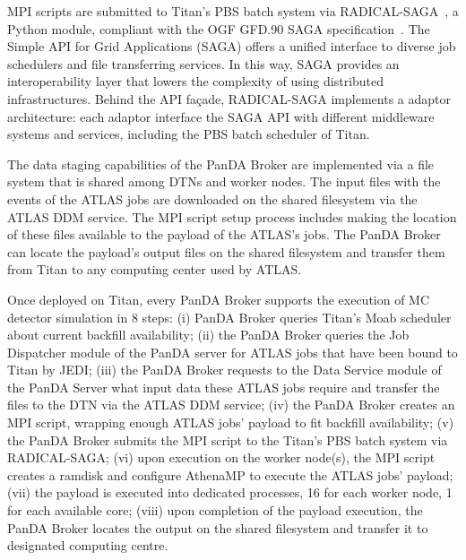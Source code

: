 MPI scripts are submitted to Titan's PBS batch system via
RADICAL-SAGA~\cite{radical-saga_url}, a Python module, compliant with the OGF
GFD.90 SAGA specification~\cite{goodale2008simple}. The Simple API for Grid
Applications (SAGA) offers a unified interface to diverse job schedulers and
file transferring services. In this way, SAGA provides an interoperability layer
that lowers the complexity of using distributed infrastructures. Behind the API
façade, RADICAL-SAGA implements a adaptor architecture: each adaptor interface
the SAGA API with different middleware systems and services, including the PBS
batch scheduler of Titan.

The data staging capabilities of the PanDA Broker are implemented via a file
system that is shared among DTNs and worker nodes. The input files with the
events of the ATLAS jobs are downloaded on the shared filesystem via the ATLAS
DDM service. The MPI script setup process includes making the location of these
files available to the payload of the ATLAS's jobs. The PanDA Broker can locate
the payload's output files on the shared filesystem and transfer them from Titan
to any computing center used by ATLAS.

Once deployed on Titan, every PanDA Broker supports the execution of MC detector
simulation in 8 steps: (i) PanDA Broker queries Titan's Moab scheduler about
current backfill availability; (ii) the PanDA Broker queries the Job Dispatcher
module of the PanDA server for ATLAS jobs that have been bound to Titan by JEDI;
(iii) the PanDA Broker requests to the Data Service module of the PanDA Server
what input data these ATLAS jobs require and transfer the files to the DTN via
the ATLAS DDM service; (iv) the PanDA Broker creates an MPI script, wrapping
enough ATLAS jobs' payload to fit backfill availability; (v) the PanDA Broker
submits the MPI script to the Titan's PBS batch system via RADICAL-SAGA; (vi)
upon execution on the worker node(s), the MPI script creates a ramdisk and
configure AthenaMP to execute the ATLAS jobs' payload; (vii) the payload is
executed into dedicated processes, 16 for each worker node, 1 for each available
core; (viii) upon completion of the payload execution, the PanDA Broker locates
the output on the shared filesystem and transfer it to designated computing
centre.


